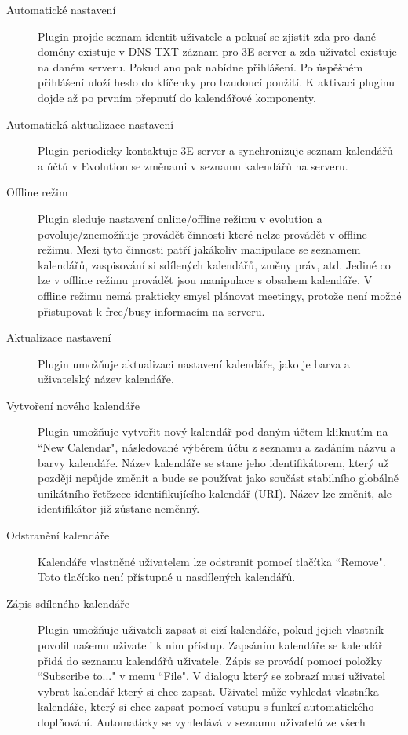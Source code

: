 \documentclass[a4paper,10pt]{article}
\begin{document}
\begin{multicols*}{2}
\begin{description}
\item[Automatické nastavení] Plugin projde seznam identit uživatele a pokusí se
zjistit zda pro dané domény existuje v DNS TXT záznam pro 3E server a zda
uživatel existuje na daném serveru. Pokud ano pak nabídne přihlášení. Po
úspěšném přihlášení uloží heslo do klíčenky pro bzudoucí použití. K aktivaci
pluginu dojde až po prvním přepnutí do kalendářové komponenty.
\item[Automatická aktualizace nastavení] Plugin periodicky kontaktuje 3E server
a synchronizuje seznam kalendářů a účtů v Evolution se změnami v seznamu kalendářů
na serveru.
\item[Offline režim] Plugin sleduje nastavení online/offline režimu v evolution
a povoluje/znemožňuje provádět činnosti které nelze provádět v offline režimu.
Mezi tyto činnosti patří jakákoliv manipulace se seznamem kalendářů, zaspisování
si sdílených kalendářů, změny práv, atd. Jediné co lze v offline režimu provádět
jsou manipulace s obsahem kalendáře. V offline režimu nemá prakticky smysl plánovat
meetingy, protože není možné přistupovat k free/busy informacím na serveru.
\item[Aktualizace nastavení] Plugin umožňuje aktualizaci nastavení kalendáře, 
jako je barva a uživatelský název kalendáře.
\item[Vytvoření nového kalendáře] Plugin umožňuje vytvořit nový kalendář pod
daným účtem kliknutím na ``New Calendar", následované výběrem účtu z seznamu a
zadáním názvu a barvy kalendáře. Název kalendáře se stane jeho identifikátorem,
který už později nepůjde změnit a bude se používat jako součást stabilního globálně
unikátního řetězece identifikujícího kalendář (URI). Název lze změnit, ale
identifikátor již zůstane neměnný.
\item[Odstranění kalendáře] Kalendáře vlastněné uživatelem lze odstranit pomocí
tlačítka ``Remove". Toto tlačítko není přístupné u nasdílených kalendářů.
\item[Zápis sdíleného kalendáře] Plugin umožňuje uživateli zapsat si cizí
kalendáře, pokud jejich vlastník povolil našemu uživateli k nim přístup. 
Zapsáním kalendáře se kalendář přidá do seznamu kalendářů uživatele. Zápis se
provádí pomocí položky ``Subscribe to..." v menu ``File". V dialogu který se
zobrazí musí uživatel vybrat kalendář který si chce zapsat. Uživatel může
vyhledat vlastníka kalendáře, který si chce zapsat pomocí vstupu s funkcí
automatického doplňování. Automaticky se vyhledává v seznamu uživatelů ze všech

\end{description}
\end{multicols*}
\end{document}
